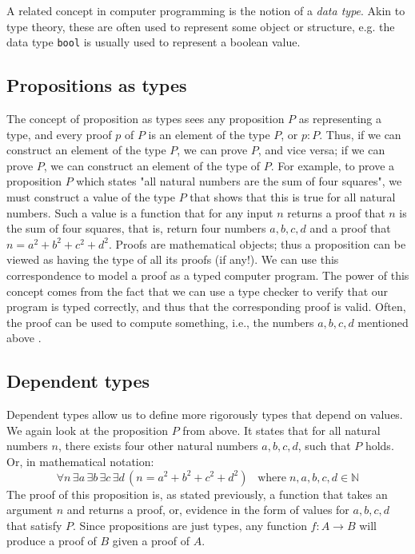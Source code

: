 A related concept in computer programming is the notion of a \emph{data type}.
Akin to type theory, these are often used to represent some object or structure,
e.g. the data type \texttt{bool} is usually used to represent a boolean value.

\subsection{Propositions as types}
\label{ssec:propositions_as_types}

The concept of proposition as types sees any proposition $P$ as representing a type,
and every proof $p$ of $P$ is an element of the type $P$, or $p : P$.
Thus, if we can construct an element of the type $P$, we can prove $P$,
and vice versa; if we can prove $P$, we can construct an element of the type of $P$.
For example, to prove a proposition $P$ which states "all natural numbers are the sum of four squares",
we must construct a value of the type $P$ that shows that this is true for all natural numbers.
Such a value is a function that for any input $n$ returns a proof that $n$ is the sum of four squares,
that is, return four numbers $a, b, c, d$ and a proof that $n = a^2 + b^2 + c^2 + d^2$.
Proofs are mathematical objects; thus a proposition can be viewed as having the type of all its proofs (if any!).
We can use this correspondence to model a proof as a typed computer program.
The power of this concept comes from the fact that we can use a type checker to verify that
our program is typed correctly, and thus that the corresponding proof is valid.
Often, the proof can be used to compute something, i.e., the numbers $a, b, c, d$ mentioned above
\cite{pwadler} \cite{lof2}.

\subsection{Dependent types}
\label{ssec:dependent_types}

Dependent types allow us to define more rigorously types that depend on values.
We again look at the proposition $P$ from above.
It states that for all natural numbers $n$,
there exists four other natural numbers $a, b, c, d$,
such that $P$ holds.
Or, in mathematical notation:
$$
\forall n \, \exists a \, \exists b \, \exists c \, \exists d \, (n = a^2 + b^2 + c^2 + d^2) \;\;\;
\text{where} \; n, a, b, c, d \in \mathbb{N}
$$
The proof of this proposition is, as stated previously,
a function that takes an argument $n$ and returns a proof, or,
evidence in the form of values for $a, b, c, d$ that satisfy $P$.
Since propositions are just types, any function $f : A \rightarrow B$
will produce a proof of $B$ given a proof of $A$.

